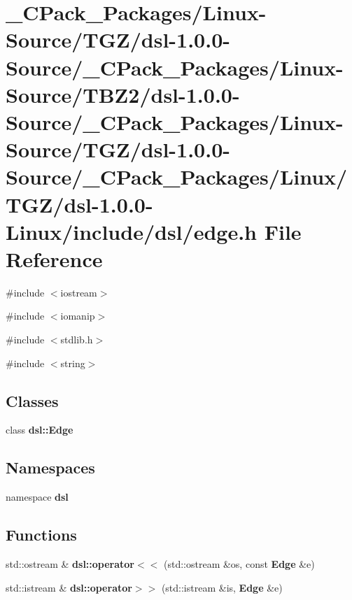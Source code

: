 \section{\_\-CPack\_\-Packages/Linux-\/Source/TGZ/dsl-\/1.0.0-\/Source/\_\-CPack\_\-Packages/Linux-\/Source/TBZ2/dsl-\/1.0.0-\/Source/\_\-CPack\_\-Packages/Linux-\/Source/TGZ/dsl-\/1.0.0-\/Source/\_\-CPack\_\-Packages/Linux/TGZ/dsl-\/1.0.0-\/Linux/include/dsl/edge.h File Reference}
\label{__CPack__Packages_2Linux-Source_2TGZ_2dsl-1_80_80-Source_2__CPack__Packages_2Linux-Source_2TBZ2_cc8028d5cbcd80e76bcab74c315e1195}
{\ttfamily \#include $<$iostream$>$}\par
{\ttfamily \#include $<$iomanip$>$}\par
{\ttfamily \#include $<$stdlib.h$>$}\par
{\ttfamily \#include $<$string$>$}\par
\subsection*{Classes}
\begin{DoxyCompactItemize}
\item 
class {\bf dsl::Edge}
\end{DoxyCompactItemize}
\subsection*{Namespaces}
\begin{DoxyCompactItemize}
\item 
namespace {\bf dsl}
\end{DoxyCompactItemize}
\subsection*{Functions}
\begin{DoxyCompactItemize}
\item 
std::ostream \& {\bf dsl::operator$<$$<$} (std::ostream \&os, const {\bf Edge} \&e)
\item 
std::istream \& {\bf dsl::operator$>$$>$} (std::istream \&is, {\bf Edge} \&e)
\end{DoxyCompactItemize}
